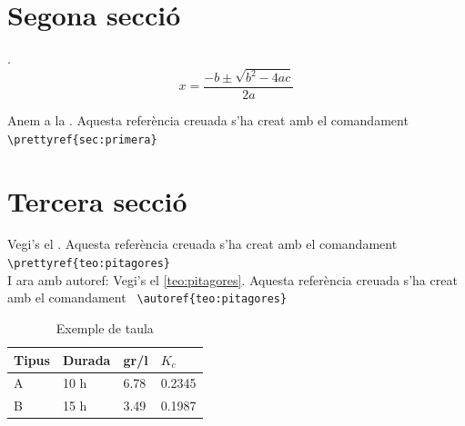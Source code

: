 \documentclass[fontsize=11pt,%
               paper=a4,%
               captions=tableheading,%
               numbers=noenddot,%
               parskip=full,%
               ]{scrartcl}
\begin{document}
\section{Segona secció}\label{sec:segona}
\lipsum[1-3].
\begin{equation}\label{eq:segongrau}
 x=\frac{-b\pm\sqrt{b^2-4ac}}{2a}
\end{equation}

\begin{tcolorbox}[%
skin=beamer,      
width=\linewidth-2cm,         %
fonttitle=\sffamily\bfseries, %
coltitle=black,               %
colframe=yellow!50!red,       %
colback=white,                %
title=Referència a secció]     %
Anem a la . Aquesta referència creuada s'ha creat amb el comandament \verb+\prettyref{sec:primera}+
\end{tcolorbox}

\lipsum[2-3]

\section{Tercera secció}\label{sec:tercera}
\lipsum[1-3]

\begin{tcolorbox}[%
skin=beamer,      
width=\linewidth-2cm,         %
fonttitle=\sffamily\bfseries, %
coltitle=black,               %
colframe=yellow!50!red,       %
colback=white,                %
title=Referència a teorema]     %
Vegi's el . Aquesta referència creuada s'ha creat amb el comandament \verb+\prettyref{teo:pitagores}+
\\I ara amb autoref: Vegi's el \autoref{teo:pitagores}. Aquesta referència creuada s'ha creat amb el comandament \verb+ \autoref{teo:pitagores}+
\end{tcolorbox}

\lipsum[2-3]

 \begin{table}[ht]
  \centering
  \begin{tabular}{llll}
    \toprule
    Tipus & Durada & gr/l & $K_c$ \\
    \midrule
    A & 10 h & 6.78 & 0.2345 \\
    B & 15 h & 3.49 & 0.1987 \\
    \bottomrule
  \end{tabular}
  \caption{Exemple de taula}
  \label{tau:durada}
\end{table}
\end{document}

